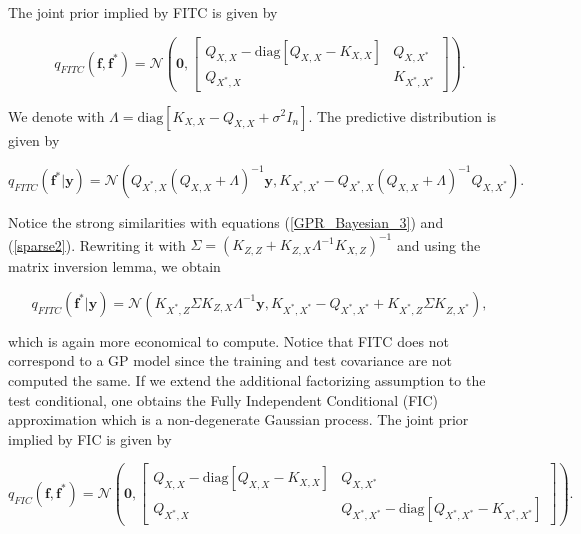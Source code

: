 \documentclass[12pt,a4paper,oneside]{book}
\begin{document}
The joint prior implied by FITC is given by

\begin{equation}
q_{FITC}(\bm{f},\bm{f}^{\ast}) = 
\mathcal{N} \left( \bm{0}, 
\begin{bmatrix}
    Q_{X,X} - \text{diag}[Q_{X,X} -K_{X,X}] & Q_{X,X^{\ast}}\\
    Q_{X^{\ast},X}  & K_{X^{\ast},X^{\ast}}
\end{bmatrix} 
\right).
\end{equation}

We denote with $\Lambda = \text{diag}[K_{X,X}-Q_{X,X} + \sigma^2 I_n]$. The predictive distribution is given by 

\begin{equation}
q_{FITC} (\bm{f}^{\ast} | \bm{y} ) = \mathcal{N}(Q_{X^{\ast},X}(Q_{X,X} + \Lambda)^{-1}\bm{y}, K_{X^{\ast} ,X^{\ast}} - Q_{X^{\ast},X}(Q_{X,X} + \Lambda)^{-1} Q_{X,X^{\ast}}).
\end{equation}

Notice the strong similarities with equations (\ref{GPR_Bayesian_3}) and (\ref{sparse2}). Rewriting it with $\Sigma = (K_{Z,Z} + K_{Z,X} \Lambda^{-1} K_{X,Z})^{-1}$ and using the matrix inversion lemma, we obtain 

\begin{equation}
\boxed{
q_{FITC} (\bm{f}^{\ast} | \bm{y} ) = \mathcal{N}( K_{X^{\ast},Z} \Sigma K_{Z,X}\Lambda^{-1} \bm{y},   K_{X^{\ast},X^{\ast}} - Q_{X^{\ast},X^{\ast}} + K_{X^{\ast},Z} \Sigma K_{Z,X^{\ast}}) ,}
\end{equation}

which is again more economical to compute. Notice that FITC does not correspond to a GP model since the training and test covariance are not computed the same. If we extend the additional factorizing assumption to the test conditional, one obtains the Fully Independent Conditional (FIC) approximation which is a non-degenerate Gaussian process. The joint prior implied by FIC is given by

\begin{equation}
q_{FIC}(\bm{f},\bm{f}^{\ast}) = 
\mathcal{N} \left( \bm{0}, 
\begin{bmatrix}
    Q_{X,X} - \text{diag}[Q_{X,X} -K_{X,X}] & Q_{X,X^{\ast}}\\
    Q_{X^{\ast},X}  & Q_{X^{\ast},X^{\ast}} - \text{diag}[Q_{X^{\ast},X^{\ast}} -K_{X^{\ast},X^{\ast}}]
\end{bmatrix} 
\right).
\end{equation}
\end{document}
